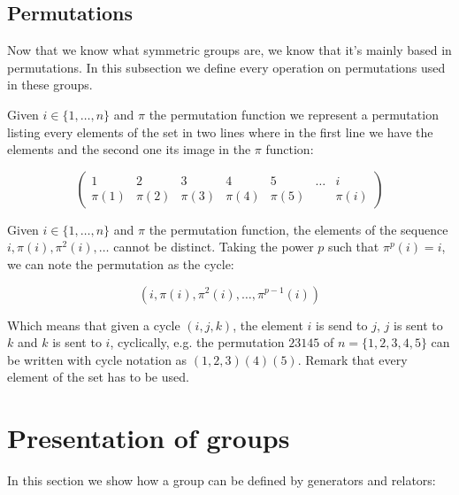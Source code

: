 \subsection{Permutations}

Now that we know what symmetric groups are, we know that it's mainly based in permutations. In this subsection we define every operation on permutations used in these groups.


\begin{definition}
Given $i \in \{1,\dots,n\}$ and $\pi$ the permutation function we represent a permutation listing every elements of the set in two lines where in the first line we have the elements and the second one its image in the $\pi$ function:

\begin{equation}
  \begin{pmatrix}
   1 & 2 & 3 & 4 & 5 & \dots & i \\
   \pi(1) & \pi(2) & \pi(3) & \pi(4) & \pi(5) & \ & \pi(i)
 \end{pmatrix}
\end{equation}

\end{definition}


\begin{definition}Given $i \in \{1,\dots,n\}$ and $\pi$ the permutation function, the elements of the sequence $i, \pi(i), \pi^2(i),\dots$ cannot be distinct. Taking the power $p$ such that $\pi^p(i) = i$, we can note the permutation as the cycle:

\begin{equation}
  (i, \pi(i), \pi^2(i), \dots, \pi^{p-1}(i))
\end{equation}
\end{definition}

Which means that given a cycle $(i,j,k)$, the element $i$ is send to $j$, $j$ is sent to $k$ and $k$ is sent to $i$, cyclically, e.g. the permutation $23145$ of $n = \{1,2,3,4,5\}$ can be written with cycle notation as $(1,2,3)(4)(5)$. Remark that every element of the set has to be used.

\section{Presentation of groups}
\label{sec:pres_group}

In this section we show how a group can be defined by generators and relators:

